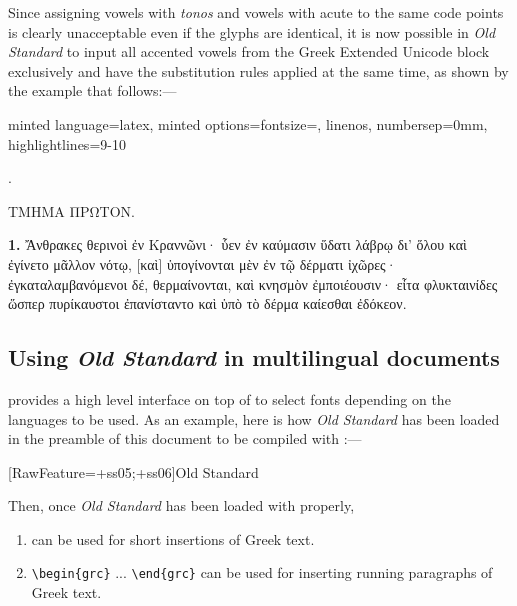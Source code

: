Since assigning vowels with \emph{tonos} and vowels with acute to the
same code points is clearly unacceptable even if the glyphs are
identical, it is now possible in \emph{Old Standard} to input all
accented vowels from the Greek Extended Unicode block exclusively and
have the substitution rules applied at the same time, as shown by the
example that follows:---
\begin{tcblisting}{minted language=latex, minted
    options={fontsize=\smaller, linenos, numbersep=0mm,
      highlightlines={9-10}}}
  \begin{grc}
    \begin{center}
      .

      ΤΜΗΜΑ ΠΡΩΤΟΝ.
    \end{center}
    
    \textbf{1.} Ἄνθρακες θερινοὶ ἐν Κραννῶνι· ὗεν ἐν καύμασιν ὕδατι
    λάβρῳ δι’ ὅλου καὶ ἐγίνετο μᾶλλον νότῳ, [καὶ] ὑπογίνονται μὲν ἐν
    τῷ δέρματι ἰχῶρες· ἐγκαταλαμβανόμενοι δέ, θερμαίνονται, καὶ
    κνησμὸν ἐμποιέουσιν· εἶτα φλυκταινίδες ὥσπερ πυρίκαυστοι
    ἐπανίσταντο καὶ ὑπὸ τὸ δέρμα καίεσθαι ἐδόκεον.
  \end{grc}
\end{tcblisting}

\subsection{Using \emph{Old Standard} in multilingual
  documents}
\label{sec:using-old-standard}
 provides a high level interface on top of 
to select fonts depending on the languages to be used. As an example,
here is how \emph{Old Standard} has been loaded in the preamble of
this document to be compiled with \LuaLaTeX:---
\begin{code}
  \usepackage[no-math]{fontspec}
  \usepackage{fontspec}
  \usepackage[greek.ancient,english]{babel}
  
  
  [RawFeature={+ss05;+ss06}]{Old Standard}
\end{code}

Then, once \emph{Old Standard} has been loaded with 
properly,
\begin{enumerate}
\item {} can be used for short insertions
  of Greek text.
\item \verb|\begin{grc}| ... \verb|\end{grc}| can be used for
  inserting running paragraphs of Greek text.
\end{enumerate}



